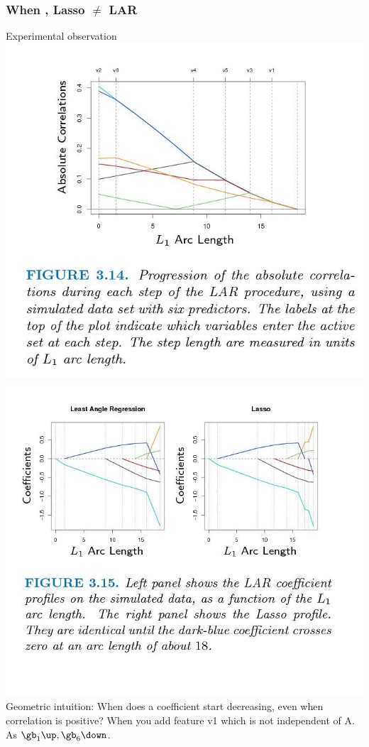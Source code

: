 \documentclass{beamer}
\begin{document}
\begin{frame}
\frametitle{When , Lasso $\neq$ LAR}
\begin{itemize}
\pitem Experimental observation\\
\includegraphics[scale=0.15]{images/figures3-13.jpg}
\includegraphics[scale=0.20]{images/figures3-14.jpg}
\pitem Geometric intuition: When does a coefficient start decreasing, even when correlation is positive? When you add feature v1 which is not independent of A. As $\gb_1 \up, \gb_6 \down$.
\end{itemize}
\end{frame}
\end{document}
